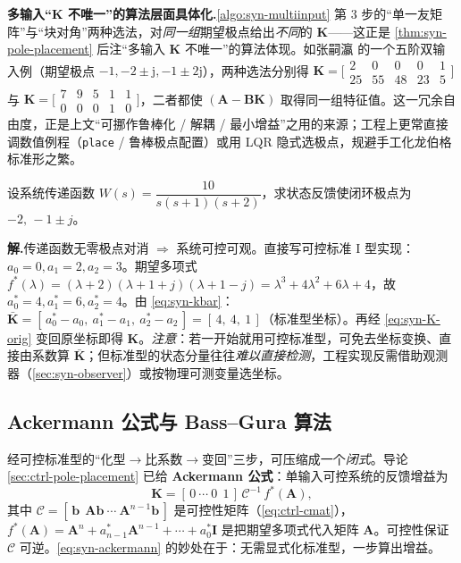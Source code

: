\begin{note}
\textbf{多输入“$\mathbf K$ 不唯一”的算法层面具体化.}\;\cref{algo:syn-multiinput} 第 3 步的“单一友矩阵”与“块对角”两种选法，对\emph{同一组}期望极点给出\emph{不同}的 $\mathbf K$——这正是 \cref{thm:syn-pole-placement} 后注“多输入 $\mathbf K$ 不唯一”的算法体现。如张嗣瀛\cite{zhang2017modern} 的一个五阶双输入例（期望极点 $-1,-2\pm\mathrm j,-1\pm2\mathrm j$），两种选法分别得 $\mathbf K=\big[\begin{smallmatrix}2&0&0&0&1\\25&55&48&23&5\end{smallmatrix}\big]$ 与 $\mathbf K=\big[\begin{smallmatrix}7&9&5&1&1\\0&0&0&1&0\end{smallmatrix}\big]$，二者都使 $(\mathbf A-\mathbf B\mathbf K)$ 取得同一组特征值。这一冗余自由度，正是上文“可挪作鲁棒化 / 解耦 / 最小增益”之用的来源；工程上更常直接调数值例程（\texttt{place} / 鲁棒极点配置）或用 LQR 隐式选极点，规避手工化龙伯格标准形之繁。
\end{note}

\begin{example}[状态反馈配置极点]
\label{ex:syn-pole}
设系统传递函数 $W(s)=\dfrac{10}{s(s+1)(s+2)}$，求状态反馈使闭环极点为 $-2,\,-1\pm j$\cite{liubao2006modern}。

\textbf{解.}\;传递函数无零极点对消 $\Rightarrow$ 系统可控可观。直接写可控标准 I 型实现：$a_0=0,a_1=2,a_2=3$。期望多项式 $f^*(\lambda)=(\lambda+2)(\lambda+1+j)(\lambda+1-j)=\lambda^3+4\lambda^2+6\lambda+4$，故 $a^*_0=4,a^*_1=6,a^*_2=4$。由 \cref{eq:syn-kbar}：$\bar{\mathbf K}=[\,a^*_0-a_0,\ a^*_1-a_1,\ a^*_2-a_2\,]=[\,4,\ 4,\ 1\,]$（标准型坐标）。再经 \cref{eq:syn-K-orig} 变回原坐标即得 $\mathbf K$。\emph{注意}：若一开始就用可控标准型，可免去坐标变换、直接由系数算 $\bar{\mathbf K}$；但标准型的状态分量往往\emph{难以直接检测}，工程实现反需借助观测器（\cref{sec:syn-observer}）或按物理可测变量选坐标。
\end{example}

\subsection{Ackermann 公式与 Bass--Gura 算法}
\label{sec:syn-ackermann}

经可控标准型的“化型$\to$比系数$\to$变回”三步，可压缩成一个\emph{闭式}。导论 \cref{sec:ctrl-pole-placement} 已给 \textbf{Ackermann 公式}\cite{ackermann1972der}：单输入可控系统的反馈增益为
\begin{equation}
  \mathbf K=[\,0\ \cdots\ 0\ \ 1\,]\,\mathcal C^{-1}\,f^*(\mathbf A),
  \label{eq:syn-ackermann}
\end{equation}
其中 $\mathcal C=[\,\mathbf b\ \ \mathbf A\mathbf b\ \cdots\ \mathbf A^{n-1}\mathbf b\,]$ 是可控性矩阵（\cref{eq:ctrl-cmat}），$f^*(\mathbf A)=\mathbf A^n+a^*_{n-1}\mathbf A^{n-1}+\cdots+a^*_0\mathbf I$ 是把期望多项式代入矩阵 $\mathbf A$。可控性保证 $\mathcal C$ 可逆。\cref{eq:syn-ackermann} 的妙处在于：无需显式化标准型，一步算出增益。

